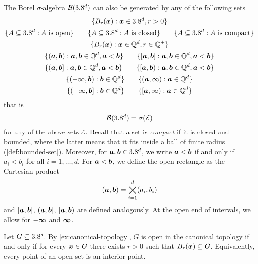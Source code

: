 \begin{example}[continues=ex:canonical-topology]
The Borel $\sigma$-algebra $\mathcal{B}(3.8^d)$ can also be generated by any of the following sets
\[
\begin{gathered}
\{B_r({\boldsymbol{x}}) : {\boldsymbol{x}} \in 3.8^d, r > 0\} \\
\{A \subseteq 3.8^d : \text{$A$ is open}\} \qquad \{A \subseteq 3.8^d : \text{$A$ is closed}\} \qquad \{A \subseteq 3.8^d : \text{$A$ is compact}\} \\
\{B_r({\boldsymbol{x}}) : {\boldsymbol{x}} \in \mathbb{Q}^d, r \in \mathbb{Q}^{+}\} \\
\{({\boldsymbol{a}},{\boldsymbol{b}}) : {\boldsymbol{a}},{\boldsymbol{b}} \in \mathbb{Q}^d, {\boldsymbol{a}} < {\boldsymbol{b}}\} \qquad \{[{\boldsymbol{a}},{\boldsymbol{b}}] : {\boldsymbol{a}},{\boldsymbol{b}} \in \mathbb{Q}^d, {\boldsymbol{a}} < {\boldsymbol{b}}\} \\
\{({\boldsymbol{a}},{\boldsymbol{b}}] : {\boldsymbol{a}},{\boldsymbol{b}} \in \mathbb{Q}^d, {\boldsymbol{a}} < {\boldsymbol{b}}\} \qquad \{[{\boldsymbol{a}},{\boldsymbol{b}}) : {\boldsymbol{a}},{\boldsymbol{b}} \in \mathbb{Q}^d, {\boldsymbol{a}} < {\boldsymbol{b}}\} \\
\{(-\infty,{\boldsymbol{b}}) : {\boldsymbol{b}} \in \mathbb{Q}^d\} \qquad \{({\boldsymbol{a}},\infty) : {\boldsymbol{a}} \in \mathbb{Q}^d\} \\
\{(-\infty,{\boldsymbol{b}}] : {\boldsymbol{b}} \in \mathbb{Q}^d\} \qquad \{[{\boldsymbol{a}},\infty) : {\boldsymbol{a}} \in \mathbb{Q}^d\}
\end{gathered}
\]
that is 
\[
\mathcal{B}(3.8^d) = \sigma(\mathcal{E})
\] 
for any of the above sets $\mathcal{E}$.
Recall that a set is \emph{compact} if it is closed and bounded, where the latter means that it fits inside a ball of finite radius (\autoref{def:bounded-set}).
Moreover, for ${\boldsymbol{a}}, {\boldsymbol{b}} \in 3.8^d$, we write ${\boldsymbol{a}} < {\boldsymbol{b}}$ if and only if $a_i < b_i$ for all $i = 1,\dots,d$.
For ${\boldsymbol{a}} < {\boldsymbol{b}}$, we define the open rectangle as the Cartesian product
\[
({\boldsymbol{a}},{\boldsymbol{b}}) = \bigtimes_{i=1}^d (a_i,b_i)
\]
and $[{\boldsymbol{a}},{\boldsymbol{b}}]$, $({\boldsymbol{a}},{\boldsymbol{b}}]$, $[{\boldsymbol{a}},{\boldsymbol{b}})$ are defined analogously.
At the open end of intervals, we allow for $-{\boldsymbol{\infty}}$ and ${\boldsymbol{\infty}}$.
\end{example}

\pagebreak[3]

\begin{remark}\label{rem:open-sets-in-Rd}
Let $G \subseteq 3.8^d$.  
By \autoref{ex:canonical-topology}, $G$ is open in the canonical topology if and only if for every ${\boldsymbol{x}}\in G$ there exists $r>0$ such that
\(
B_r({\boldsymbol{x}}) \subseteq G
\).
Equivalently, every point of an open set is an interior point.
\end{remark}

